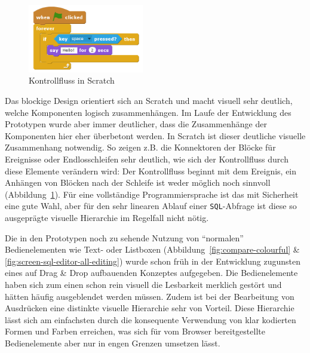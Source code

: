 
\begin{figure}
  \includegraphics[width=0.45\textwidth]{images/scratch-control-flow}
  \caption{Kontrollfluss in Scratch}
  \label{fig:screen-scratch-control-flow}
\end{figure}

Das blockige Design orientiert sich an Scratch und macht visuell sehr deutlich, welche Komponenten logisch zusammenhängen. Im Laufe der Entwicklung des Prototypen wurde aber immer deutlicher, dass die Zusammenhänge der Komponenten hier eher überbetont werden. In Scratch ist dieser deutliche visuelle Zusammenhang notwendig. So zeigen z.B. die Konnektoren der Blöcke für Ereignisse oder Endlosschleifen sehr deutlich, wie sich der Kontrollfluss durch diese Elemente verändern wird: Der Kontrollfluss beginnt mit dem Ereignis, ein Anhängen von Blöcken nach der Schleife ist weder möglich noch sinnvoll (Abbildung~\ref{fig:screen-scratch-control-flow}).  Für eine vollständige Programmiersprache ist das mit Sicherheit eine gute Wahl, aber für den sehr linearen Ablauf einer \texttt{SQL}-Abfrage ist diese so ausgeprägte visuelle Hierarchie im Regelfall nicht nötig.

Die in den Prototypen noch zu sehende Nutzung von ``normalen'' Bedienelementen wie Text- oder Listboxen (Abbildung~\ref{fig:compare-colourful} \& \ref{fig:screen-sql-editor-all-editing}) wurde schon früh in der Entwicklung zugunsten eines auf Drag \& Drop aufbauenden Konzeptes aufgegeben. Die Bedienelemente haben sich zum einen schon rein visuell die Lesbarkeit merklich gestört und hätten häufig ausgeblendet werden müssen. Zudem ist bei der Bearbeitung von Ausdrücken eine distinkte visuelle Hierarchie sehr von Vorteil. Diese Hierarchie lässt sich am einfachsten durch die konsequente Verwendung von klar kodierten Formen und Farben erreichen, was sich für vom Browser bereitgestellte Bedienelemente aber nur in engen Grenzen umsetzen lässt.

